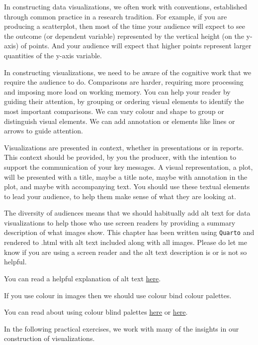 \documentclass[
  letterpaper,
  DIV=11,
  numbers=noendperiod]{scrreprt}
\begin{document}
In constructing data visualizations, we often work with conventions,
established through common practice in a research tradition. For
example, if you are producing a scatterplot, then most of the time your
audience will expect to see the outcome (or dependent variable)
represented by the vertical height (on the y-axis) of points. And your
audience will expect that higher points represent larger quantities of
the y-axis variable.

In constructing visualizations, we need to be aware of the cognitive
work that we require the audience to do. Comparisons are harder,
requiring more processing and imposing more load on working memory. You
can help your reader by guiding their attention, by grouping or ordering
visual elements to identify the most important comparisons. We can vary
colour and shape to group or distinguish visual elements. We can add
annotation or elements like lines or arrows to guide attention.

Visualizations are presented in context, whether in presentations or in
reports. This context should be provided, by you the producer, with the
intention to support the communication of your key messages. A visual
representation, a plot, will be presented with a title, maybe a title
note, maybe with annotation in the plot, and maybe with accompanying
text. You should use these textual elements to lead your audience, to
help them make sense of what they are looking at.

The diversity of audiences means that we should habitually add alt text
for data visualizations to help those who use screen readers by
providing a summary description of what images show. This chapter has
been written using \texttt{Quarto} and rendered to .html with alt text
included along with all images. Please do let me know if you are using a
screen reader and the alt text description is or is not so helpful.

You can read a helpful explanation of alt text
\href{https://medium.com/nightingale/writing-alt-text-for-data-visualization-2a218ef43f81}{here}.

If you use colour in images then we should use colour bind colour
palettes.

You can read about using colour blind palettes
\href{http://www.cookbook-r.com/Graphs/Colors_(ggplot2)/}{here} or
\href{https://cran.r-project.org/web/packages/viridis/vignettes/intro-to-viridis.html}{here}.

In the following practical exercises, we work with many of the insights
in our construction of visualizations.
\end{document}
